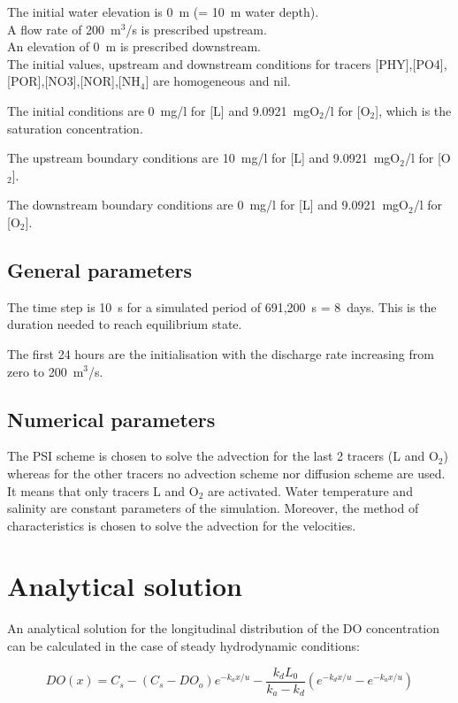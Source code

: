 The initial water elevation is 0~m (= 10~m water depth).\\
A flow rate of 200~m$^3$/s is prescribed upstream.\\
An elevation of 0~m is prescribed downstream.\\

The initial values, upstream and downstream conditions for tracers
[PHY],[PO4],[POR],[NO3],[NOR],[NH$_4$]
are homogeneous and nil.

The initial conditions are 0~mg/l for [L] and 9.0921~mgO$_2$/l for [O$_2$],
which is the saturation concentration.

The upstream boundary conditions are 10~mg/l for [L] and 9.0921~mgO$_2$/l for
[O$_2$].

The downstream boundary conditions are 0~mg/l for [L] and 9.0921~mgO$_2$/l for
[O$_2$].

\subsection{General parameters}

The time step is 10~s for a simulated period of 691,200~s = 8~days.
This is the duration needed to reach equilibrium state.

The first 24 hours are the initialisation with the discharge rate increasing
from zero to 200~m$^3$/s.

\subsection{Numerical parameters}

The PSI scheme is chosen to solve the advection for the last 2 tracers
(L and O$_2$) whereas for the other tracers no advection scheme nor diffusion
scheme are used. It means that only tracers L and O$_2$ are activated.
Water temperature and salinity are constant parameters of the simulation.
Moreover, the method of characteristics is chosen to solve the advection for
the velocities.

\section{Analytical solution}
\label{Analytical}
An analytical solution for the longitudinal distribution of the DO concentration
can be calculated in the case of steady hydrodynamic conditions:

$$ DO(x)=C_s-(C_s-DO_o) e^{-k_a x/u} 
- \frac{k_d L_0}{k_a - k_d}
(e^{-k_d x/u} - e^{-k_a x/u})$$

